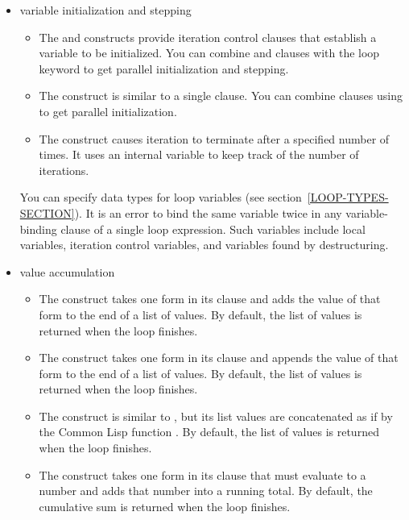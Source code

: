   \begin{itemize}

  \item 
  variable initialization and stepping

  \begin{itemize}
  \item
  The  and  constructs provide iteration control clauses
  that establish a variable to be initialized.
  You can combine  and  clauses with the loop
  keyword  to get parallel initialization and stepping.

  \item
  The  construct is similar to a single  clause.
  You can combine  clauses using
   to get parallel initialization.

  \item
  The  construct causes iteration to terminate after a specified
   number of times.  It uses an internal variable to keep track of the
   number of iterations.
  \end{itemize}

  You can specify data types for loop variables (see
  section~\ref{LOOP-TYPES-SECTION}).
  It is an error to bind the same variable twice in any variable-binding
  clause of a single loop expression.  Such variables include
  local variables, iteration control variables, and variables found by
  destructuring.


  \item value accumulation

  \begin{itemize}
  \item The  construct takes one form in its clause
  and adds the value of that form to the end of a list of values.  By
  default, the list of values is returned when the loop finishes.

  \item
  The  construct  takes one form in its clause
  and appends the value of that form to the end of a list of values.  By
  default, the list of values is returned when the loop finishes.

  \item The  construct is similar to , but
  its list values are concatenated as if by the Common Lisp function
  .  By
  default, the list of values is returned when the loop finishes.

  \item The  construct takes one form in its clause that
  must evaluate to a number and adds that number into a running total.
  By default, the cumulative sum is returned when the loop finishes.


\end{itemize}
\end{itemize}
